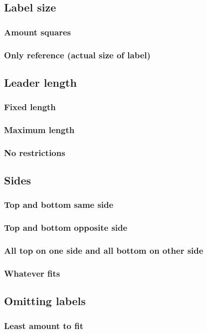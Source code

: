 \documentclass[a4paper]{article}
\begin{document}
\subsection{Label size}
\subsubsection{Amount squares}
\subsubsection{Only reference (actual size of label)}
\subsection{Leader length}
\subsubsection{Fixed length}
\subsubsection{Maximum length}
\subsubsection{No restrictions}
\subsection{Sides}
\subsubsection{Top and bottom same side}
\subsubsection{Top and bottom opposite side}
\subsubsection{All top on one side and all bottom on other side}
\subsubsection{Whatever fits}
\subsection{Omitting labels}
\subsubsection{Least amount to fit}
\end{document}
